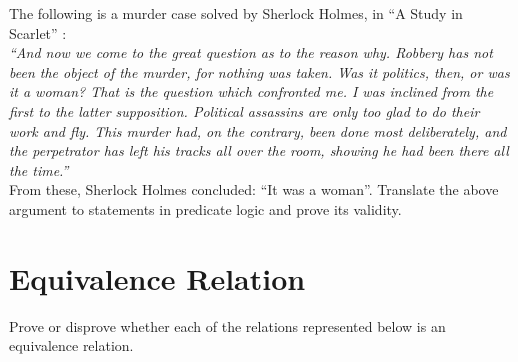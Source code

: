 \documentclass[addpoints]{exam}
\begin{document}
\begin{questions}

\question[10]
  The following is a murder case solved by Sherlock Holmes, in “A Study
  in Scarlet” :\\
  \textit{“And now we come to the great question as to the reason why. Robbery
    has not been the object of the murder, for nothing was taken. Was it
    politics, then, or was it a woman?  That is the question which confronted
    me. I was inclined from the first to the latter supposition. Political
    assassins are only too glad to do their work and fly. This murder had, on
    the contrary, been done most deliberately, and the perpetrator has left
    his tracks all over the room, showing he had been
    there all the time.”}\\
  From these, Sherlock Holmes concluded: ``It was a woman''.  Translate the
  above argument to statements in predicate logic and prove its validity.
  \begin{solution}
  \end{solution}
  
  \section{Equivalence Relation}
  
\question Prove or disprove whether each of the relations represented below is an equivalence relation.
\end{questions}
\end{document}
